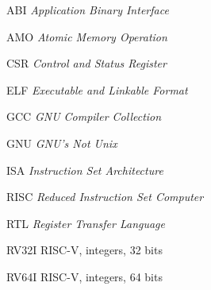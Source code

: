 \documentclass[
	12pt,				%
	openright,			%
	twoside,			%
	a4paper,			%
	english,			%
	french,				%
	spanish,			%
	brazil				%
	]{abntex2}
\newcommand{\listofquadrosname}{Lista de quadros}
\begin{document}
 

  

\listoffigures*
\cleardoublepage


\listoftables*
\cleardoublepage

\begin{siglas}
  \item[ABI] \textit{Application Binary Interface}
  \item[AMO] \textit{Atomic Memory Operation}
  \item[CSR] \textit{Control and Status Register}
  \item[ELF] \textit{Executable and Linkable Format}
  \item[GCC] \textit{GNU Compiler Collection}
  \item[GNU] \textit{GNU's Not Unix}
  \item[ISA] \textit{Instruction Set Architecture}
  \item[RISC] \textit{Reduced Instruction Set Computer}
  \item[RTL] \textit{Register Transfer Language}
  \item[RV32I] RISC-V, integers, 32 bits
  \item[RV64I] RISC-V, integers, 64 bits
\end{siglas}

\tableofcontents*
\cleardoublepage
\end{document}
